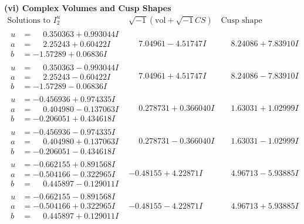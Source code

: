 \documentclass[1p]{elsarticle_modified}
\theoremstyle{definition}
\newcommand{\I}{\sqrt{-1}}
\begin{document}
\newpage\flushleft \textbf{(vi) Complex Volumes and Cusp Shapes}
$$\begin{array}{c|c|c}  
\text{Solutions to }I^u_{2}& \I (\text{vol} + \sqrt{-1}CS) & \text{Cusp shape}\\
 \hline 
\begin{aligned}
u &= \phantom{-}0.350363 + 0.993044 I \\
a &= \phantom{-}2.25243 + 0.60422 I \\
b &= -1.57289 + 0.06836 I\end{aligned}
 & \phantom{-}7.04961 - 4.51747 I & \phantom{-}8.24086 + 7.83910 I \\ \hline\begin{aligned}
u &= \phantom{-}0.350363 - 0.993044 I \\
a &= \phantom{-}2.25243 - 0.60422 I \\
b &= -1.57289 - 0.06836 I\end{aligned}
 & \phantom{-}7.04961 + 4.51747 I & \phantom{-}8.24086 - 7.83910 I \\ \hline\begin{aligned}
u &= -0.456936 + 0.974335 I \\
a &= \phantom{-}0.404980 - 0.137063 I \\
b &= -0.206051 + 0.434618 I\end{aligned}
 & \phantom{-}0.278731 + 0.366040 I & \phantom{-}1.63031 + 1.02999 I \\ \hline\begin{aligned}
u &= -0.456936 - 0.974335 I \\
a &= \phantom{-}0.404980 + 0.137063 I \\
b &= -0.206051 - 0.434618 I\end{aligned}
 & \phantom{-}0.278731 - 0.366040 I & \phantom{-}1.63031 - 1.02999 I \\ \hline\begin{aligned}
u &= -0.662155 + 0.891568 I \\
a &= -0.504166 - 0.322965 I \\
b &= \phantom{-}0.445897 - 0.129011 I\end{aligned}
 & -0.48155 + 4.22871 I & \phantom{-}4.96713 - 5.93885 I \\ \hline\begin{aligned}
u &= -0.662155 - 0.891568 I \\
a &= -0.504166 + 0.322965 I \\
b &= \phantom{-}0.445897 + 0.129011 I\end{aligned}
 & -0.48155 - 4.22871 I & \phantom{-}4.96713 + 5.93885 I \\ \hline\begin{aligned}

\end{aligned}
\end{array}$$
\end{document}
